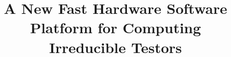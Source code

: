 \documentclass[authoryear,preprint,review,12pt]{elsarticle}
\begin{document}
\begin{frontmatter}



\title{A New Fast Hardware Software Platform for Computing Irreducible Testors}



\address{Computer Science Department}
\address{National Institute for Astrophysics, Optics and Electronics}
\address{Sta. Ma. Tonanzintla, Puebla, 72840, Mexico}


\end{frontmatter}
\end{document}
